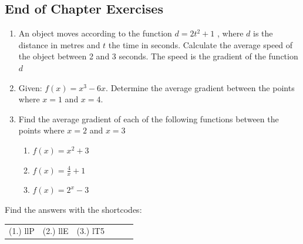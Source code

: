             \subsection{ End of Chapter Exercises}
            \nopagebreak
            \label{m39240*id191703}\begin{enumerate}[noitemsep, label=\textbf{\arabic*}. ] 
            \label{m39240*uid9}\item An object moves according to the function $d=2{t}^{2}+1$ , where \begin{math}d\end{math} is the distance in metres and \begin{math}t\end{math} the time in seconds. Calculate the average speed of the object between 2 and 3 seconds. The speed is the gradient of the function \begin{math}d\end{math}\newline
\label{m39240*uid10}\item Given: $f\left(x\right)={x}^{3}-6x$.
Determine the average gradient between the points where $x=1$ and \begin{math}x=4\end{math}.\newline
\label{m39240*uid111}\item Find the average gradient of each of the following functions between the points where $x=2$ and \begin{math}x=3\end{math}
\label{m39240*id62342}\begin{enumerate}[noitemsep, label=\textbf{\alph*}. ] 
            \item $f\left(x\right)={x}^{2}+3$\item \begin{math}f\left(x\right)=\frac{4}{x}+1\end{math}\item \begin{math}f\left(x\right)={2}^{x}-3\end{math}\end{enumerate}
\end{enumerate}
  \label{m39240**end}
  \label{3b3f311aa3ebba82678f2a2244617492**end}
\par {} Find the answers with the shortcodes:
 \par \begin{tabular}[h]{cccccc}
 (1.) llP  &  (2.) llE  &  (3.) lT5  & \end{tabular}
